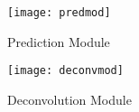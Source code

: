 \documentclass{article}
\begin{document}
\begin{figure}
    \centering
    \texttt{[image: predmod]}
    \caption{Prediction Module}
    \label{fig:predmod1}
\end{figure}

\begin{figure}
    \centering
    \texttt{[image: deconvmod]}
    \caption{Deconvolution Module}
    \label{fig:deconvmod1}
\end{figure}
\end{document}
